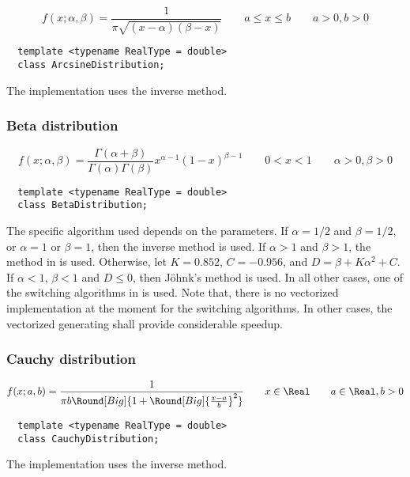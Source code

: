\begin{equation*}
  f(x;\alpha,\beta) = \frac{1}{\pi\sqrt{(x - \alpha)(\beta - x)}}
  \qquad a \le x \le b
  \qquad a > 0, b > 0
\end{equation*}
\begin{Verbatim}
  template <typename RealType = double>
  class ArcsineDistribution;
\end{Verbatim}
The implementation uses the inverse method.

\subsubsection{Beta distribution}

\begin{equation*}
  f(x;\alpha,\beta) =
  \frac{\Gamma(\alpha + \beta)}{\Gamma(\alpha)\Gamma(\beta)}
  x^{\alpha - 1}(1 - x)^{\beta - 1}
  \qquad 0 < x < 1
  \qquad \alpha > 0, \beta > 0
\end{equation*}
\begin{Verbatim}
  template <typename RealType = double>
  class BetaDistribution;
\end{Verbatim}
The specific algorithm used depends on the parameters. If $\alpha = 1/2$ and
$\beta = 1/2$, or $\alpha = 1$ or $\beta = 1$, then the inverse method is used.
If $\alpha > 1$ and $\beta > 1$, the method in \textcite{Cheng:1978jl} is used.
Otherwise, let $K = 0.852$, $C = -0.956$, and $D = \beta + K\alpha^2 + C$. If
$\alpha < 1$, $\beta < 1$ and $D \le 0$, then Jöhnk's method
\parencite[sec.~3.5]{Devroye:1986gi} is used. In all other cases, one of the
switching algorithms in \textcite{Atkinson:1979es} is used. Note that, there is
no vectorized implementation at the moment for the switching algorithms. In
other cases, the vectorized generating shall provide considerable speedup.

\subsubsection{Cauchy distribution}

\begin{equation*}
  f(x;a,b) = \frac{1}{\pi b\Round[Big]{
      1 + \Round[Big]{\frac{x - a}{b}}^2}}
  \qquad x \in \Real
  \qquad a \in \Real, b > 0
\end{equation*}
\begin{Verbatim}
  template <typename RealType = double>
  class CauchyDistribution;
\end{Verbatim}
The implementation uses the inverse method.


